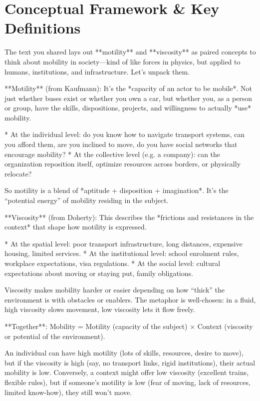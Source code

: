 \section{Conceptual Framework & Key Definitions}
The text you shared lays out **motility** and **viscosity** as paired concepts to think about mobility in society—kind of like forces in physics, but applied to humans, institutions, and infrastructure. Let’s unpack them.

**Motility** (from Kaufmann):
It’s the *capacity of an actor to be mobile*. Not just whether buses exist or whether you own a car, but whether you, as a person or group, have the skills, dispositions, projects, and willingness to actually *use* mobility.

* At the individual level: do you know how to navigate transport systems, can you afford them, are you inclined to move, do you have social networks that encourage mobility?
* At the collective level (e.g. a company): can the organization reposition itself, optimize resources across borders, or physically relocate?

So motility is a blend of *aptitude + disposition + imagination*. It’s the “potential energy” of mobility residing in the subject.

**Viscosity** (from Doherty):
This describes the *frictions and resistances in the context* that shape how motility is expressed.

* At the spatial level: poor transport infrastructure, long distances, expensive housing, limited services.
* At the institutional level: school enrolment rules, workplace expectations, visa regulations.
* At the social level: cultural expectations about moving or staying put, family obligations.

Viscosity makes mobility harder or easier depending on how “thick” the environment is with obstacles or enablers. The metaphor is well-chosen: in a fluid, high viscosity slows movement, low viscosity lets it flow freely.

**Together**:
Mobility = Motility (capacity of the subject) × Context (viscosity or potential of the environment).

An individual can have high motility (lots of skills, resources, desire to move), but if the viscosity is high (say, no transport links, rigid institutions), their actual mobility is low. Conversely, a context might offer low viscosity (excellent trains, flexible rules), but if someone’s motility is low (fear of moving, lack of resources, limited know-how), they still won’t move.

